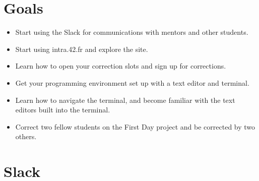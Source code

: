 \documentclass{42-en}
\begin{document}
\startexercices



\chapter{Goals}

\begin{itemize}

	\item Start using the Slack for communications with mentors and other students.

	\item Start using intra.42.fr and explore the site.

	\item Learn how to open your correction slots and sign up for corrections.

	\item Get your programming environment set up with a text editor and terminal.

	\item Learn how to navigate the terminal, and become familiar with the text editors built into the terminal.

	\item Correct two fellow students on the First Day project and be corrected by two others.


\end{itemize}


\chapter{Slack}
\end{document}
